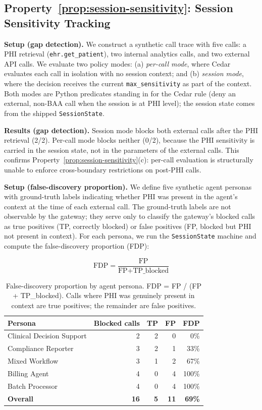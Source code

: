 \subsection{Property~\ref{prop:session-sensitivity}: Session Sensitivity Tracking}

\textbf{Setup (gap detection).} We construct a synthetic call trace with five calls: a PHI
retrieval (\texttt{ehr.get\_patient}), two internal analytics calls, and two external API
calls. We evaluate two policy modes: (a) \emph{per-call mode}, where Cedar evaluates each
call in isolation with no session context; and (b) \emph{session mode}, where the
decision receives the current \texttt{max\_sensitivity} as part of the context. Both modes
are Python predicates standing in for the Cedar rule (deny an external, non-BAA call when
the session is at PHI level); the session state comes from the shipped
\texttt{SessionState}.

\textbf{Results (gap detection).} Session mode blocks both external calls after the PHI
retrieval (2/2). Per-call mode blocks neither (0/2), because the PHI sensitivity is carried
in the session state, not in the parameters of the external calls. This confirms
Property~\ref{prop:session-sensitivity}(c): per-call evaluation is structurally unable to
enforce cross-boundary restrictions on post-PHI calls.

\textbf{Setup (false-discovery proportion).} We define five synthetic agent personas with
ground-truth labels indicating whether PHI was present in the agent's context at the time
of each external call. The ground-truth labels are not observable by the gateway; they serve
only to classify the gateway's blocked calls as true positives (TP, correctly blocked) or
false positives (FP, blocked but PHI not present in context). For each persona, we run the
\texttt{SessionState} machine and compute the false-discovery proportion (FDP):

\[
  \text{FDP} = \frac{\text{FP}}{\text{FP} + \text{TP\_blocked}}
\]

\begin{table}[h]
\centering
\caption{False-discovery proportion by agent persona. FDP = FP / (FP + TP\_blocked). Calls where
PHI was genuinely present in context are true positives; the remainder are false positives.}
\label{tab:fpr}
\begin{tabular}{lrrrr}
\toprule
Persona & Blocked calls & TP & FP & FDP \\
\midrule
Clinical Decision Support & 2 & 2 & 0 & 0\% \\
Compliance Reporter        & 3 & 2 & 1 & 33\% \\
Mixed Workflow             & 3 & 1 & 2 & 67\% \\
Billing Agent              & 4 & 0 & 4 & 100\% \\
Batch Processor            & 4 & 0 & 4 & 100\% \\
\midrule
\textbf{Overall}           & \textbf{16} & \textbf{5} & \textbf{11} & \textbf{69\%} \\
\bottomrule
\end{tabular}
\end{table}

